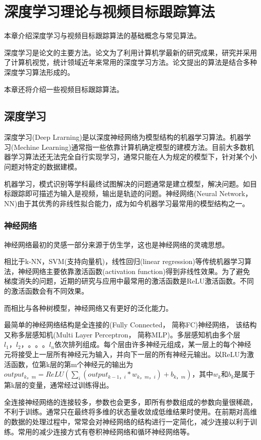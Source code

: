 
\chapter{深度学习理论与视频目标跟踪算法}
本章介绍深度学习与视频目标跟踪算法的基础概念与常见算法。
\par
深度学习是论文的主要方法。论文为了利用计算机学最新的研究成果，研究并采用了计算机视觉，统计领域近年来常用的深度学习方法。论文提出的算法是结合多种深度学习算法形成的。
\par
本章还将介绍一些视频目标跟踪算法。

\section{深度学习}
深度学习(Deep Lrarning)是以深度神经网络为模型结构的机器学习算法\supercite{deng2014deep}。机器学习(Mechine Learning)通常指一些依靠计算机确定模型的建模方法。目前大多数机器学习算法还无法完全自行实现学习，通常只能在人为规定的模型下，针对某个小问题对特定的数据建模。
\par
机器学习，模式识别等学科最终试图解决的问题通常是建立模型，解决问题。如目标跟踪即可描述为输入是视频，输出是轨迹的问题。神经网络(Neural Network， NN)由于其优秀的非线性拟合能力，成为如今机器学习最常用的模型结构之一。
\subsection{神经网络}
神经网络最初的灵感一部分来源于仿生学\supercite{mcculloch1943logical}\supercite{farley1954simulation}，这也是神经网络的灵魂思想。
\par
相比于k-NN，SVM(支持向量机)，线性回归(linear regression)等传统机器学习算法，神经网络主要依靠激活函数(activation function)得到非线性效果。为了避免梯度消失的问题，近期的研究与应用中最常用的激活函数是ReLU激活函数\supercite{krizhevsky2012imagenet}。不同的激活函数会有不同效果\supercite{karlik2011performance}。
\par
而相比与各种树模型，神经网络又有更好的泛化能力。
\par
最简单的神经网络结构是全连接的(Fully Connected， 简称FC)神经网络， 该结构又称多层感知机(Multi Layer Perceptron， 简称MLP)。多层感知机由多个层$l_1，l_2，。。。l_n$依次排列组成。每个层由许多神经元组成，某一层上的每个神经元将接受上一层所有神经元为输入，并向下一层的所有神经元输出。以ReLU为激活函数，位第k层的第m个神经元的输出为$output_{k，m}=ReLU(\sum_{i} (output_{k-1，i}*w_{k，m，i})+b_{k，m})$，其中$w_{k}$和$b_{k}$是属于第k层的变量，通常经过训练得出。
\par
全连接神经网络的连接较多，参数也会更多，即所有参数组成的参数向量很稀疏，不利于训练。通常只在最终将多维的状态量收敛成低维结果时使用。在前期对高维的数据的处理过程中，常常会对神经网络的结构进行一定简化，减少连接以利于训练。常用的减少连接方式有卷积神经网络和循环神经网络等。
\par
